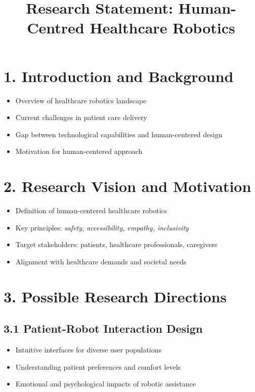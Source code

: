 \documentclass[11pt, a4paper]{article}
\title{\textbf{Research Statement: Human-Centred Healthcare Robotics}}
\author{}
\date{}
\begin{document}
\maketitle

\section*{1. Introduction and Background}
\begin{itemize}
    \item Overview of healthcare robotics landscape
    \item Current challenges in patient care delivery
    \item Gap between technological capabilities and human-centered design
    \item Motivation for human-centered approach
\end{itemize}

\section*{2. Research Vision and Motivation}
\begin{itemize}
    \item Definition of human-centered healthcare robotics
    \item Key principles: \textit{safety, accessibility, empathy, inclusivity}
    \item Target stakeholders: patients, healthcare professionals, caregivers
    \item Alignment with healthcare demands and societal needs
\end{itemize}

\section*{3. Possible Research Directions}

\subsection*{3.1 Patient-Robot Interaction Design}
\begin{itemize}
    \item Intuitive interfaces for diverse user populations
    \item Understanding patient preferences and comfort levels
    \item Emotional and psychological impacts of robotic assistance
\end{itemize}
\end{document}
